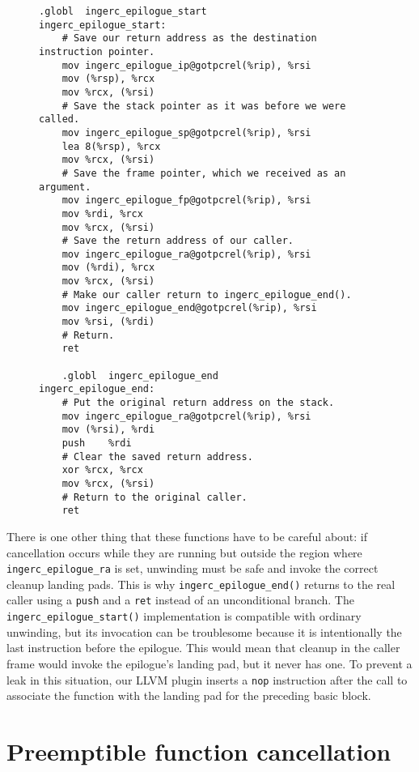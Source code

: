 \begin{figure}
\begin{lstlisting}[label=lst:epilogue,language={[x86masm]Assembler},caption=Code to support time travel out of the epilogue. The \texttt{@gotpcrel} replocations are position-independent GOT lookups of the globals' accesses.]
	.globl	ingerc_epilogue_start
ingerc_epilogue_start:
	# Save our return address as the destination instruction pointer.
	mov	ingerc_epilogue_ip@gotpcrel(%rip), %rsi
	mov	(%rsp), %rcx
	mov	%rcx, (%rsi)
	# Save the stack pointer as it was before we were called.
	mov	ingerc_epilogue_sp@gotpcrel(%rip), %rsi
	lea	8(%rsp), %rcx
	mov	%rcx, (%rsi)
	# Save the frame pointer, which we received as an argument.
	mov	ingerc_epilogue_fp@gotpcrel(%rip), %rsi
	mov	%rdi, %rcx
	mov	%rcx, (%rsi)
	# Save the return address of our caller.
	mov	ingerc_epilogue_ra@gotpcrel(%rip), %rsi
	mov	(%rdi), %rcx
	mov	%rcx, (%rsi)
	# Make our caller return to ingerc_epilogue_end().
	mov	ingerc_epilogue_end@gotpcrel(%rip), %rsi
	mov	%rsi, (%rdi)
	# Return.
	ret

	.globl	ingerc_epilogue_end
ingerc_epilogue_end:
	# Put the original return address on the stack.
	mov	ingerc_epilogue_ra@gotpcrel(%rip), %rsi
	mov	(%rsi), %rdi
	push	%rdi
	# Clear the saved return address.
	xor	%rcx, %rcx
	mov	%rcx, (%rsi)
	# Return to the original caller.
	ret
\end{lstlisting}
\end{figure}

\begin{sloppypar}
There is one other thing that these functions have to be careful about:\@
if cancellation occurs while they are running but outside the region where
\texttt{ingerc\_epilogue\_ra} is set, unwinding must be safe and invoke the correct
cleanup landing pads.  This is why \texttt{ingerc\_epilogue\_end()} returns to the
real caller using a \texttt{push} and a \texttt{ret} instead of an unconditional
branch.  The \texttt{ingerc\_epilogue\_start()} implementation is compatible with
ordinary unwinding, but its invocation can be troublesome because it is
intentionally the last instruction before the epilogue.  This would mean that cleanup
in the caller frame would invoke the epilogue's landing pad, but it never has one.
To prevent a leak in this situation, our LLVM plugin inserts a \texttt{nop}
instruction after the call to associate the function with the landing pad for the
preceding basic block.
\end{sloppypar}


\section{Preemptible function cancellation}

